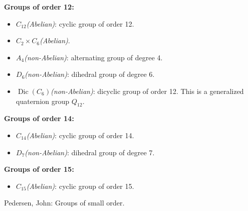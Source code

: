 \documentclass[12pt]{article}
\DeclareMathOperator{\Dic}{Dic}
\begin{document}
\textbf{Groups of order 12:}
\begin{itemize}
\item $C_{12}$\textit{(Abelian)}: cyclic group of order 12.
\item $C_2\times C_6$\textit{(Abelian)}.
\item $A_4$\textit{(non-Abelian)}: alternating group of degree 4.
\item $D_6$\textit{(non-Abelian)}: dihedral group of degree 6.
\item $\Dic(C_6)$\textit{(non-Abelian)}: dicyclic group of order 12.
This is a generalized quaternion group $Q_{12}$.
\end{itemize}

\textbf{Groups of order 14:}
\begin{itemize}
\item $C_{14}$\textit{(Abelian)}: cyclic group of order 14.
\item $D_7$\textit{(non-Abelian)}: dihedral group of degree 7.
\end{itemize}

\textbf{Groups of order 15:}
\begin{itemize}
\item $C_{15}$\textit{(Abelian)}: cyclic group of order 15.
\end{itemize}

\begin{thebibliography}{1}
 Pedersen, John: Groups of small order. 
\end{thebibliography}
\end{document}
